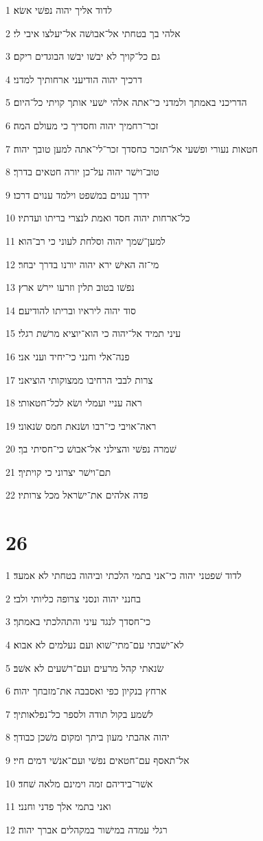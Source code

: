 \par 1 לדוד אליך יהוה נפשׁי אשׂא׃
\par 2 אלהי בך בטחתי אל־אבושׁה אל־יעלצו איבי לי׃
\par 3 גם כל־קויך לא יבשׁו יבשׁו הבוגדים ריקם׃
\par 4 דרכיך יהוה הודיעני ארחותיך למדני׃
\par 5 הדריכני באמתך ולמדני כי־אתה אלהי ישׁעי אותך קויתי כל־היום׃
\par 6 זכר־רחמיך יהוה וחסדיך כי מעולם המה׃
\par 7 חטאות נעורי ופשׁעי אל־תזכר כחסדך זכר־לי־אתה למען טובך יהוה׃
\par 8 טוב־וישׁר יהוה על־כן יורה חטאים בדרך׃
\par 9 ידרך ענוים במשׁפט וילמד ענוים דרכו׃
\par 10 כל־ארחות יהוה חסד ואמת לנצרי בריתו ועדתיו׃
\par 11 למען־שׁמך יהוה וסלחת לעוני כי רב־הוא׃
\par 12 מי־זה האישׁ ירא יהוה יורנו בדרך יבחר׃
\par 13 נפשׁו בטוב תלין וזרעו יירשׁ ארץ׃
\par 14 סוד יהוה ליראיו ובריתו להודיעם׃
\par 15 עיני תמיד אל־יהוה כי הוא־יוציא מרשׁת רגלי׃
\par 16 פנה־אלי וחנני כי־יחיד ועני אני׃
\par 17 צרות לבבי הרחיבו ממצוקותי הוציאני׃
\par 18 ראה עניי ועמלי ושׂא לכל־חטאותי׃
\par 19 ראה־אויבי כי־רבו ושׂנאת חמס שׂנאוני׃
\par 20 שׁמרה נפשׁי והצילני אל־אבושׁ כי־חסיתי בך׃
\par 21 תם־וישׁר יצרוני כי קויתיך׃
\par 22 פדה אלהים את־ישׂראל מכל צרותיו׃

\chapter{26}

\par 1 לדוד שׁפטני יהוה כי־אני בתמי הלכתי וביהוה בטחתי לא אמעד׃
\par 2 בחנני יהוה ונסני צרופה כליותי ולבי׃
\par 3 כי־חסדך לנגד עיני והתהלכתי באמתך׃
\par 4 לא־ישׁבתי עם־מתי־שׁוא ועם נעלמים לא אבוא׃
\par 5 שׂנאתי קהל מרעים ועם־רשׁעים לא אשׁב׃
\par 6 ארחץ בנקיון כפי ואסבבה את־מזבחך יהוה׃
\par 7 לשׁמע בקול תודה ולספר כל־נפלאותיך׃
\par 8 יהוה אהבתי מעון ביתך ומקום משׁכן כבודך׃
\par 9 אל־תאסף עם־חטאים נפשׁי ועם־אנשׁי דמים חיי׃
\par 10 אשׁר־בידיהם זמה וימינם מלאה שׁחד׃
\par 11 ואני בתמי אלך פדני וחנני׃
\par 12 רגלי עמדה במישׁור במקהלים אברך יהוה׃


